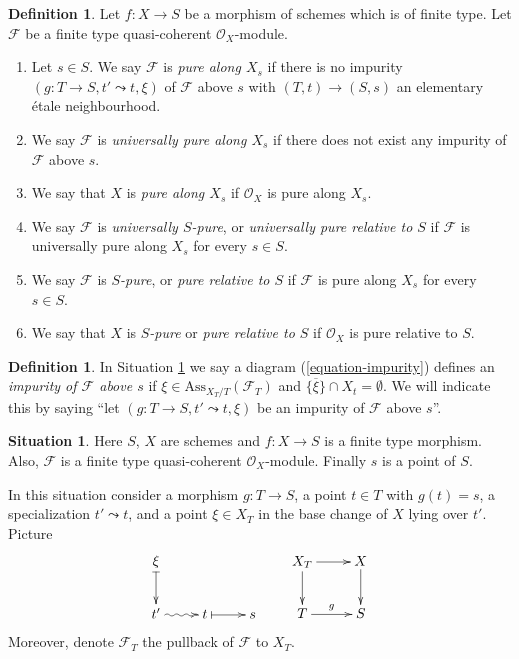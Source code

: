 \documentclass{amsart}
\theoremstyle{plain}
\theoremstyle{definition}
\newtheorem{definition}[subsection]{Definition}
\newtheorem{situation}[subsection]{Situation}
\theoremstyle{remark}
\numberwithin{equation}{subsection}
\begin{document}
\begin{definition}
\label{definition-pure}
Let $f : X \to S$ be a morphism of schemes which is of finite type.
Let $\mathcal{F}$ be a finite type quasi-coherent $\mathcal{O}_X$-module.
\begin{enumerate}
\item Let $s \in S$. We say $\mathcal{F}$ is {\it pure along $X_s$}
if there is no impurity $(g : T \to S, t' \leadsto t, \xi)$
of $\mathcal{F}$ above $s$ with $(T, t) \to (S, s)$ an
elementary \'etale neighbourhood.
\item We say $\mathcal{F}$ is {\it universally pure along $X_s$}
if there does not exist any impurity of $\mathcal{F}$ above $s$.
\item We say that $X$ is {\it pure along $X_s$} if $\mathcal{O}_X$
is pure along $X_s$.
\item We say $\mathcal{F}$ is {\it universally $S$-pure}, or
{\it universally pure relative to $S$} if $\mathcal{F}$ is universally
pure along $X_s$ for every $s \in S$.
\item We say $\mathcal{F}$ is {\it $S$-pure}, or
{\it pure relative to $S$} if $\mathcal{F}$ is pure along $X_s$
for every $s \in S$.
\item We say that $X$ is {\it $S$-pure} or {\it pure relative to $S$}
if $\mathcal{O}_X$ is pure relative to $S$.
\end{enumerate}
\end{definition}

\begin{definition}
\label{definition-impurity}
In
Situation \ref{situation-pre-pure}
we say a diagram (\ref{equation-impurity}) defines an
{\it impurity of $\mathcal{F}$ above $s$}
if $\xi \in \text{Ass}_{X_T/T}(\mathcal{F}_T)$ and
$\overline{\{\xi\}} \cap X_t = \emptyset$. We will indicate
this by saying ``let $(g : T \to S, t' \leadsto t, \xi)$ be
an impurity of $\mathcal{F}$ above $s$''.
\end{definition}

\begin{situation}
\label{situation-pre-pure}
Here $S$, $X$ are schemes and $f : X \to S$ is a finite type morphism.
Also, $\mathcal{F}$ is a finite type quasi-coherent $\mathcal{O}_X$-module.
Finally $s$ is a point of $S$.
\end{situation}

\noindent
In this situation consider a morphism $g : T \to S$, a point $t \in T$
with $g(t) = s$, a specialization $t' \leadsto t$, and a point
$\xi \in X_T$ in the base change of $X$ lying over $t'$. Picture
\begin{equation}
\label{equation-impurity}
\vcenter{
\xymatrix{
\xi \ar@{|->}[d] & \\
t' \ar@{~>}[r] & t \ar@{|->}[r] & s
}
}
\quad\quad
\vcenter{
\xymatrix{
X_T \ar[d] \ar[r] & X \ar[d] \\
T \ar[r]^g & S
}
}
\end{equation}
Moreover, denote $\mathcal{F}_T$ the pullback of $\mathcal{F}$ to $X_T$.
\end{document}

